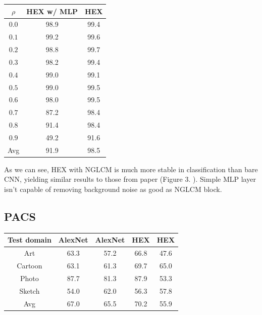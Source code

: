 \documentclass{article} %
\begin{document}
\begin{table}[H]
    \centering
    \begin{tabular}{ccc}
        \hline
        $\rho$ & HEX w/ MLP& HEX\\
        \hline
        $0.0$ & 98.9 & 99.4 \\
        $0.1$ & 99.2 & 99.6 \\
        $0.2$ & 98.8 & 99.7 \\
        $0.3$ & 98.2 & 99.4 \\
        $0.4$ & 99.0 & 99.1 \\
        $0.5$ & 99.0 & 99.5 \\
        $0.6$ & 98.0 & 99.5 \\
        $0.7$ & 87.2 & 98.4 \\
        $0.8$ & 91.4 & 98.4 \\
        $0.9$ & 49.2 & 91.6 \\
        \hline
        Avg & 91.9 & 98.5 \\
        \hline
    \end{tabular}
\end{table}


As we can see, HEX with NGLCM is much more stable in classification than bare CNN, yielding similar results
to those from paper (Figure 3.  \citep{wang2018learning}). 
Simple MLP layer isn't capable of removing background noise as good as NGLCM block.

\subsection{PACS}

\begin{table}[H]
    \centering
    \begin{tabular}{ccccc}
        \hline
        Test domain & AlexNet & \color{blue} AlexNet \color{black} & HEX & \color{blue} HEX \color{black} \\
        \hline
        Art     & 63.3 & 57.2 & 66.8 & 47.6 \\
        Cartoon & 63.1 & 61.3 & 69.7 & 65.0 \\
        Photo   & 87.7 & 81.3 & 87.9 & 53.3 \\
        Sketch  & 54.0 & 62.0 & 56.3 & 57.8 \\
        \hline
        Avg     & 67.0 & 65.5 & 70.2 & 55.9 \\
        \hline
    \end{tabular}
\end{table}
\end{document}
